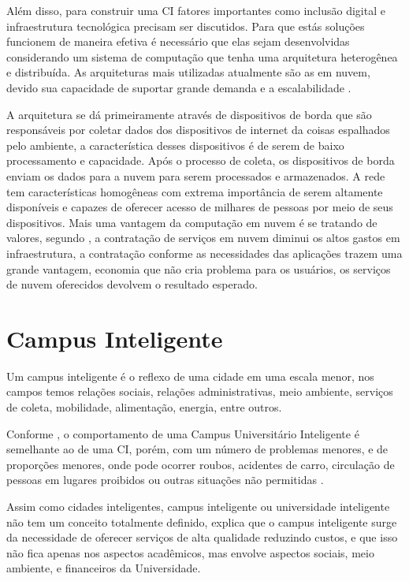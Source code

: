 Além disso, para construir uma CI fatores importantes como inclusão digital e infraestrutura tecnológica precisam ser discutidos. Para que estás soluções funcionem de maneira efetiva é necessário que elas sejam desenvolvidas considerando um sistema de computação que tenha uma arquitetura heterogênea e distribuída. As arquiteturas mais utilizadas atualmente são as em nuvem, devido sua capacidade de suportar grande demanda e a escalabilidade \cite{patricia}. 

A arquitetura se dá primeiramente através de dispositivos de borda que são responsáveis por coletar dados dos dispositivos de internet da coisas espalhados pelo ambiente, a característica desses dispositivos é de serem de baixo processamento e capacidade. Após o processo de coleta, os dispositivos de borda enviam os dados para a nuvem para serem processados e armazenados. A rede tem características homogêneas com extrema importância de serem altamente disponíveis e capazes de oferecer acesso de milhares de pessoas por meio de seus dispositivos. Mais uma vantagem da computação em nuvem é se tratando de valores, segundo \cite{patricia}, a contratação de serviços em nuvem diminui os altos gastos em infraestrutura, a contratação conforme as necessidades das aplicações trazem uma grande vantagem, economia que não cria problema para os usuários, os serviços de nuvem oferecidos devolvem o resultado esperado.



\section{Campus Inteligente}

Um campus inteligente é o reflexo de uma cidade em uma escala menor, nos campos temos relações sociais, relações administrativas, meio ambiente, serviços de coleta, mobilidade, alimentação, energia, entre outros.

Conforme , o comportamento de uma Campus Universitário Inteligente é semelhante ao de uma CI, porém, com um número de problemas menores, e de proporções menores, onde pode ocorrer roubos, acidentes de carro, circulação de pessoas em lugares proibidos ou outras situações não permitidas \cite{garay2018}.

Assim como cidades inteligentes, campus inteligente ou universidade inteligente não tem um conceito totalmente definido,  explica que o campus inteligente surge da necessidade de oferecer serviços de alta qualidade reduzindo custos, e que isso não fica apenas nos aspectos acadêmicos, mas envolve aspectos sociais, meio ambiente, e financeiros da Universidade.

